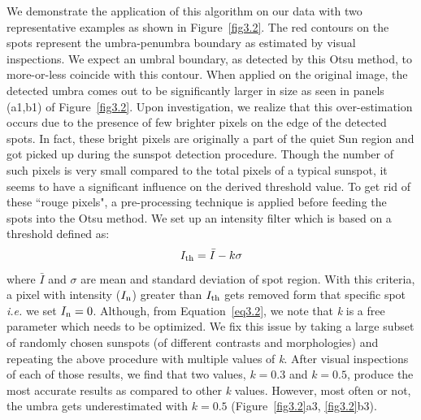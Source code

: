  We demonstrate the application of this algorithm on our data with two representative examples as shown in Figure~\ref{fig3.2}. The red contours on the spots represent the umbra-penumbra boundary as estimated by visual inspections. We expect an umbral boundary, as detected by this Otsu method, to more-or-less coincide with this contour. When applied on the original image, the detected umbra comes out to be significantly larger in size as seen in panels (a1,b1) of Figure~\ref{fig3.2}. Upon investigation, we realize that this over-estimation occurs due to the presence of few brighter pixels on the edge of the detected spots. In fact, these bright pixels are originally a part of the quiet Sun region and got picked up during the sunspot detection procedure. Though the number of such pixels is very small compared to the total pixels of a typical sunspot, it seems to have a significant influence on the derived threshold value. To get rid of these ``rouge pixels", a pre-processing technique is applied before feeding the spots into the Otsu method. We set up an intensity filter which is based on a threshold defined as:
%
\begin{equation}
I_{\rm th}=\bar{I}-k\sigma
\label{eq3.2}
\end{equation}
where $\bar{I}$ and $\sigma$ are mean and standard deviation of spot region. With this criteria, a pixel with intensity ($ I_{\rm n}$) greater than $I_{\rm th}$ gets removed form that specific spot {\it i.e.} we set $I_{\rm n}=0$. Although, from Equation~\ref{eq3.2}, we note that {\it k} is a free parameter which needs to be optimized. We fix this issue by taking a large subset of randomly chosen sunspots (of different contrasts and morphologies) and repeating the above procedure with multiple values of {\it k}. After visual inspections of each of those results, we find that two values, $ k=0.3$ and $k=0.5$, produce the most accurate results as compared to other {\it k} values. However, most often or not, the umbra gets underestimated with $k = 0.5$ (Figure~\ref{fig3.2}a3, \ref{fig3.2}b3).


